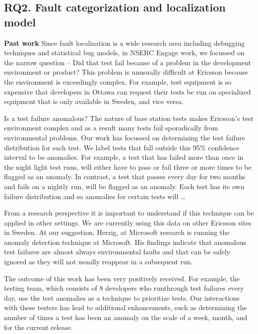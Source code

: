 \documentclass[12pt, letterpaper]{article}
\begin{document}
\subsection*{RQ2. Fault categorization and localization model} 

\begin{comment}
Since tests fail non-deterministically
Which failures should be looked at first?
Use failure distributions to find anomalous failures and report to testing team each morning.
\end{comment}


\textbf{Past work}
Since fault localization is a wide research area including debugging techniques and statistical bug models, in NSERC Engage work, we focussed on the narrow question -- Did that test fail because of a problem in the development environment or product? This problem is unusually difficult at Ericsson because the environment is exceedingly complex.  For example, test equipment is so expensive that developers in Ottawa can request their tests be run on specialized equipment that is only available in Sweden, and vice versa.
%

Is a test failure anomalous? The nature of base station tests makes Ericsson's test environment complex and as a result many tests fail sporadically from environmental problems. Our work has focussed on determining the test failure distribution for each test. We label tests that fall outside this 95\% confidence interval to be anomalies. For example, a test that has failed more than once in the night light test runs, will either have to pass or fail three or more times to be flagged as an anomaly. In contrast, a test that passes every day for two months and fails on a nightly run, will be flagged as an anomaly. Each test has its own failure distribution and so anomalies for certain tests will …

From a research perspective it is important to understand if this technique can be applied in other settings. We are currently using this data on other Ericsson sites in Sweden. At our suggestion, Herzig, at Microsoft research is running the anomaly detection technique at Microsoft. His findings indicate that anomalous test failures are almost always environmental faults and that can be safely ignored as they will not usually reappear in a subsequent run.

The outcome of this work has been very positively received. For example, the testing team, which consists of 8 developers who runthrough test failures every day, use the test anomalies as a technique to prioritize tests. Our interactions with these testers has lead to additional enhancements, such as determining the number of times a test has been an anomaly on the scale of a week, month, and for the current release. 
\end{document}
